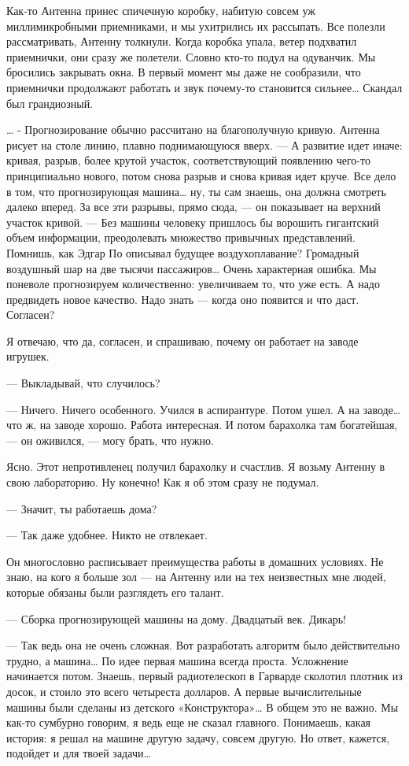 Как-то   Антенна  принес   спичечную   коробку,   набитую  совсем   уж
миллимикробными приемниками, и мы ухитрились их рассыпать. Все полезли
рассматривать, Антенну толкнули. Когда  коробка упала, ветер подхватил
приемнички, они сразу  же полетели. Словно кто-то  подул на одуванчик.
Мы бросились  закрывать окна. В  первый момент мы даже  не сообразили,
что  приемнички  продолжают  работать   и  звук  почему-то  становится
сильнее… Скандал был грандиозный.

… -  Прогнозирование обычно  рассчитано на  благополучную кривую.  Антенна
рисует на  столе линию,  плавно  поднимающуюся вверх.  — А  развитие  идет
иначе: кривая,  разрыв, более  крутой участок,  соответствующий  появлению
чего-то принципиально  нового,  потом снова  разрыв  и снова  кривая  идет
круче. Все дело в том, что  прогнозирующая машина… ну, ты сам знаешь,  она
должна смотреть  далеко вперед.  За  все эти  разрывы,  прямо сюда,  —  он
показывает на верхний участок  кривой. — Без  машины человеку пришлось  бы
ворошить гигантский  объем  информации, преодолевать  множество  привычных
представлений. Помнишь,  как Эдгар  По описывал  будущее  воздухоплавание?
Громадный воздушный  шар  на  две  тысячи  пассажиров…  Очень  характерная
ошибка. Мы поневоле  прогнозируем количественно: увеличиваем  то, что  уже
есть. А надо предвидеть новое качество. Надо знать — когда оно появится  и
что даст. Согласен?

Я отвечаю, что  да, согласен, и  спрашиваю, почему он  работает на  заводе
игрушек.

— Выкладывай, что случилось?

— Ничего.  Ничего  особенного. Учился  в  аспирантуре. Потом  ушел.  А  на
заводе… что ж, на заводе хорошо. Работа интересная. И потом барахолка  там
богатейшая, — он оживился, — могу брать, что нужно.

Ясно. Этот непротивленец получил барахолку и счастлив. Я возьму Антенну  в
свою лабораторию. Ну конечно! Как я об этом сразу не подумал.

— Значит, ты работаешь дома?

— Так даже удобнее. Никто не отвлекает.

Он многословно  расписывает преимущества  работы в  домашних условиях.  Не
знаю, на кого я больше зол — на Антенну или на тех неизвестных мне  людей,
которые обязаны были разглядеть его талант.

— Сборка прогнозирующей машины на дому. Двадцатый век. Дикарь!

—  Так  ведь  она  не   очень  сложная.  Вот  разработать  алгоритм   было
действительно трудно,  а  машина… По  идее  первая машина  всегда  проста.
Усложнение начинается  потом.  Знаешь,  первый  радиотелескоп  в  Гарварде
сколотил плотник из досок, и стоило это всего четыреста долларов. А первые
вычислительные машины были сделаны из детского «Конструктора»… В общем это
не важно.  Мы как-то  сумбурно говорим,  я ведь  еще не  сказал  главного.
Понимаешь, какая история: я решал на машине другую задачу, совсем  другую.
Но ответ, кажется, подойдет и для твоей задачи…

